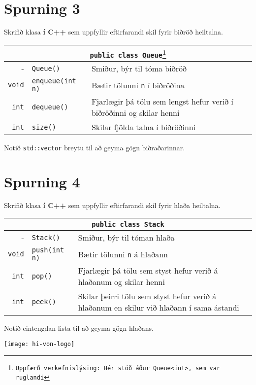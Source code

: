 \documentclass{article}
\begin{document}
\newpage

\section{Spurning 3}
Skrifið klasa \textbf{í C++} sem uppfyllir eftirfarandi skil fyrir biðröð heiltalna.

\begin{center}
\begin{tabularx}{\textwidth}{rlX}
\toprule
\multicolumn{3}{c}{\texttt{public class Queue\footnote{Uppfærð verkefnislýsing: Hér stóð áður Queue<int>, sem var ruglandi}}}\\
\midrule
-&\texttt{Queue()}& Smiður, býr til tóma biðröð\\
\texttt{void}&\texttt{enqueue(int n)}&Bætir tölunni \texttt{n} í biðröðina\\
\texttt{int}&\texttt{dequeue()}&Fjarlægir þá tölu sem lengst hefur verið í biðröðinni og skilar henni\\
\texttt{int}&\texttt{size()}&Skilar fjölda talna í biðröðinni\\
\bottomrule
\end{tabularx}
\end{center}

Notið \texttt{std::vector} breytu til að geyma gögn biðraðarinnar.

\section{Spurning 4}
Skrifið klasa \textbf{í C++} sem uppfyllir eftirfarandi skil fyrir hlaða heiltalna. 

\begin{center}
\begin{tabularx}{\textwidth}{rlX}
\toprule
\multicolumn{3}{c}{\texttt{public class Stack}}\\
\midrule
-&\texttt{Stack()}& Smiður, býr til tóman hlaða\\
\texttt{void}&\texttt{push(int n)}&Bætir tölunni \texttt{n} á hlaðann\\
\texttt{int}&\texttt{pop()}&Fjarlægir þá tölu sem styst hefur verið á hlaðanum og skilar henni\\
\texttt{int}&\texttt{peek()}&Skilar þeirri tölu sem styst hefur verið á hlaðanum en skilur við hlaðann í sama ástandi\\
\bottomrule
\end{tabularx}
\end{center}

Notið eintengdan lista til að geyma gögn hlaðans.

\vfill
\texttt{[image: hi-von-logo]}
\end{document}
